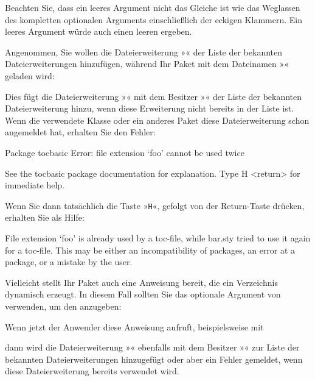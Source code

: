 Beachten Sie, dass ein leeres Argument 
nicht das Gleiche ist wie das Weglassen des kompletten optionalen Arguments
einschließlich der eckigen Klammern. Ein leeres Argument würde auch einen
leeren  ergeben.
\begin{Example}
  Angenommen, Sie wollen die Dateierweiterung »« der Liste der
  bekannten Dateierweiterungen hinzufügen, während Ihr Paket mit dem
  Dateinamen »« geladen wird:
\begin{lstcode}
\end{lstcode}
  Dies fügt die Dateierweiterung »« mit dem Besitzer
  »« der Liste der bekannten Dateierweiterung hinzu, wenn diese
  Erweiterung nicht bereits in der Liste ist. Wenn die verwendete
  Klasse oder ein anderes Paket diese Dateierweiterung schon angemeldet hat,
  erhalten Sie den Fehler:
\begin{lstoutput}
  Package tocbasic Error: file extension `foo' cannot be used twice

  See the tocbasic package documentation for explanation.
  Type H <return> for immediate help.
\end{lstoutput}
  Wenn Sie dann tatsächlich die Taste »\texttt{H}«, gefolgt von der
  Return-Taste drücken, erhalten Sie als Hilfe:
\begin{lstoutput}
  File extension `foo' is already used by a toc-file, while bar.sty
  tried to use it again for a toc-file.
  This may be either an incompatibility of packages, an error at a package,
  or a mistake by the user.
\end{lstoutput}

  Vielleicht stellt Ihr Paket auch eine Anweisung bereit, die ein
  Verzeichnis dynamisch erzeugt. In diesem Fall sollten Sie das
  optionale Argument von  verwenden, um den
   anzugeben:
\begin{lstcode}
  \newcommand*{\createnewlistofsomething}[1]{%
    \addtotoclist[bar.sty]{#1}%
  }
\end{lstcode}
  Wenn jetzt der Anwender diese Anweisung aufruft, beispielsweise mit
\begin{lstcode}
\end{lstcode}
  dann wird die Dateierweiterung »« ebenfalls mit dem Besitzer
  »« zur Liste der bekannten Dateierweiterungen hinzugefügt
  oder aber ein Fehler gemeldet, wenn diese Dateierweiterung bereits verwendet
  wird. 
\end{Example}

